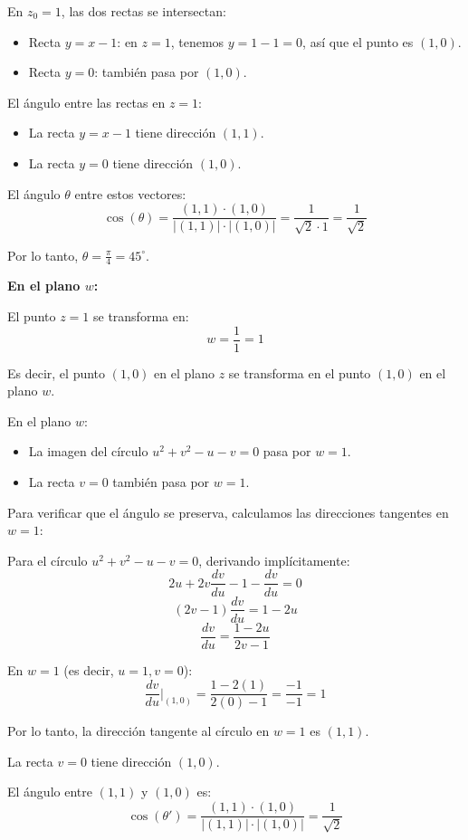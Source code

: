 \documentclass{article}
\begin{document}
En $z_0 = 1$, las dos rectas se intersectan:
\begin{itemize}
\item Recta $y = x - 1$: en $z = 1$, tenemos $y = 1 - 1 = 0$, así que el punto es $(1, 0)$.
\item Recta $y = 0$: también pasa por $(1, 0)$.
\end{itemize}

El ángulo entre las rectas en $z = 1$:
\begin{itemize}
\item La recta $y = x - 1$ tiene dirección $(1, 1)$.
\item La recta $y = 0$ tiene dirección $(1, 0)$.
\end{itemize}

El ángulo $\theta$ entre estos vectores:
$$\cos(\theta) = \frac{(1, 1) \cdot (1, 0)}{|(1, 1)| \cdot |(1, 0)|} = \frac{1}{\sqrt{2} \cdot 1} = \frac{1}{\sqrt{2}}$$

Por lo tanto, $\theta = \frac{\pi}{4} = 45^\circ$.

\textbf{En el plano $w$:}

El punto $z = 1$ se transforma en:
$$w = \frac{1}{1} = 1$$

Es decir, el punto $(1, 0)$ en el plano $z$ se transforma en el punto $(1, 0)$ en el plano $w$.

En el plano $w$:
\begin{itemize}
\item La imagen del círculo $u^2 + v^2 - u - v = 0$ pasa por $w = 1$.
\item La recta $v = 0$ también pasa por $w = 1$.
\end{itemize}

Para verificar que el ángulo se preserva, calculamos las direcciones tangentes en $w = 1$:

Para el círculo $u^2 + v^2 - u - v = 0$, derivando implícitamente:
$$2u + 2v\frac{dv}{du} - 1 - \frac{dv}{du} = 0$$
$$(2v - 1)\frac{dv}{du} = 1 - 2u$$
$$\frac{dv}{du} = \frac{1 - 2u}{2v - 1}$$

En $w = 1$ (es decir, $u = 1, v = 0$):
$$\frac{dv}{du}\Big|_{(1,0)} = \frac{1 - 2(1)}{2(0) - 1} = \frac{-1}{-1} = 1$$

Por lo tanto, la dirección tangente al círculo en $w = 1$ es $(1, 1)$.

La recta $v = 0$ tiene dirección $(1, 0)$.

El ángulo entre $(1, 1)$ y $(1, 0)$ es:
$$\cos(\theta') = \frac{(1, 1) \cdot (1, 0)}{|(1, 1)| \cdot |(1, 0)|} = \frac{1}{\sqrt{2}}$$
\end{document}
